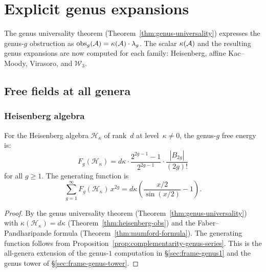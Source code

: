 \chapter{Explicit genus expansions}\label{ch:genus-expansions}


The genus universality theorem
(Theorem~\ref{thm:genus-universality}) expresses the genus-$g$
obstruction as $\mathrm{obs}_g(\mathcal{A}) = \kappa(\mathcal{A}) \cdot \lambda_g$.
The scalar $\kappa(\mathcal{A})$ and the resulting genus expansions are now
computed for each family: Heisenberg, affine Kac--Moody, Virasoro,
and $\mathcal{W}_3$.

\section{Free fields at all genera}\label{sec:free-field-genera}

\subsection{Heisenberg algebra}\label{subsec:heisenberg-all-genera}

\begin{theorem}\label{thm:heisenberg-all-genera}
For the Heisenberg algebra $\mathcal{H}_\kappa$
of rank~$d$ at level~$\kappa \neq 0$, the genus-$g$
free energy is:
\begin{equation}\label{eq:heisenberg-Fg}
F_g(\mathcal{H}_\kappa) = d\kappa \cdot
\frac{2^{2g-1}-1}{2^{2g-1}} \cdot
\frac{|B_{2g}|}{(2g)!}
\end{equation}
for all $g \geq 1$.  The generating function is
\begin{equation}\label{eq:heisenberg-generating}
\sum_{g=1}^{\infty} F_g(\mathcal{H}_\kappa)\, x^{2g}
= d\kappa \left(\frac{x/2}{\sin(x/2)} - 1\right).
\end{equation}
\end{theorem}

\begin{proof}
By the genus universality theorem
(Theorem~\ref{thm:genus-universality}) with
$\kappa(\mathcal{H}_\kappa) = d\kappa$
(Theorem~\ref{thm:heisenberg-obs}) and
the Faber--Pandharipande formula
(Theorem~\ref{thm:mumford-formula}).
The generating function follows from
Proposition~\ref{prop:complementarity-genus-series}.
This is the all-genera extension of the genus-$1$ computation in
\S\ref{sec:frame-genus1} and the genus tower of \S\ref{sec:frame-genus-tower}.
\end{proof}

